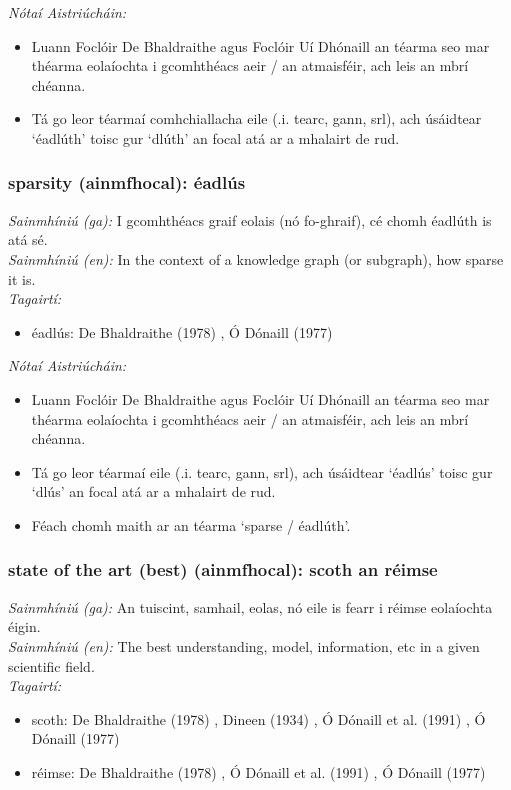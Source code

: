  \noindent \textit{Nótaí Aistriúcháin:}
\begin{itemize}
	\item Luann Foclóir De Bhaldraithe agus Foclóir Uí Dhónaill an téarma seo mar théarma eolaíochta i gcomhthéacs aeir / an atmaisféir, ach leis an mbrí chéanna.
	\item Tá go leor téarmaí comhchiallacha eile (.i. tearc, gann, srl), ach úsáidtear `éadlúth' toisc gur `dlúth' an focal atá ar a mhalairt de rud.
\end{itemize}


\subsubsection*{sparsity (ainmfhocal): éadlús}
 \noindent \textit{Sainmhíniú (ga):} I gcomhthéacs graif eolais (nó fo-ghraif), cé chomh éadlúth is atá sé.
\\
 \noindent \textit{Sainmhíniú (en):} In the context of a knowledge graph (or subgraph), how sparse it is.
\\
 \noindent \textit{Tagairtí:}
\begin{itemize}
	\item éadlús: De Bhaldraithe (1978) \cite{de-bhaldraithe}, Ó Dónaill (1977) \cite{odonaill}
\end{itemize}

 \noindent \textit{Nótaí Aistriúcháin:}
\begin{itemize}
	\item Luann Foclóir De Bhaldraithe agus Foclóir Uí Dhónaill an téarma seo  mar théarma eolaíochta i gcomhthéacs aeir / an atmaisféir, ach leis an mbrí chéanna.
	\item Tá go leor téarmaí eile (.i. tearc, gann, srl), ach úsáidtear `éadlús' toisc gur `dlús' an focal atá ar a mhalairt de rud.
	\item Féach chomh maith ar an téarma `sparse / éadlúth'.
\end{itemize}


\subsubsection*{state of the art (best) (ainmfhocal): scoth an réimse}
 \noindent \textit{Sainmhíniú (ga):} An tuiscint, samhail, eolas, nó eile is fearr i réimse eolaíochta éigin.
\\
 \noindent \textit{Sainmhíniú (en):} The best understanding, model, information, etc in a given scientific field.
\\
 \noindent \textit{Tagairtí:}
\begin{itemize}
	\item scoth: De Bhaldraithe (1978) \cite{de-bhaldraithe}, Dineen (1934) \cite{dineen}, Ó Dónaill et al. (1991) \cite{focloir-beag}, Ó Dónaill (1977) \cite{odonaill}
	\item réimse: De Bhaldraithe (1978) \cite{de-bhaldraithe}, Ó Dónaill et al. (1991) \cite{focloir-beag}, Ó Dónaill (1977) \cite{odonaill}
\end{itemize}

